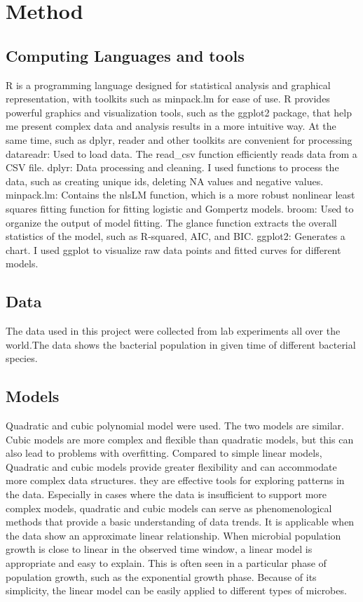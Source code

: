 \documentclass{article}
\begin{document}
\section{Method}
\subsection{Computing Languages and tools}
R is a programming language designed for statistical analysis and graphical representation, with toolkits such as minpack.lm for ease of use.
R provides powerful graphics and visualization tools, such as the ggplot2 package, that help me present complex data and analysis results in a more intuitive way. 
At the same time, such as dplyr, reader and other toolkits are convenient for processing datareadr: Used to load data. 
The read_csv function efficiently reads data from a CSV file.
dplyr: Data processing and cleaning. I used functions to process the data, such as creating unique ids, deleting NA values and negative values.
minpack.lm: Contains the nlsLM function, which is a more robust nonlinear least squares fitting function for fitting logistic and Gompertz models.
broom: Used to organize the output of model fitting. The glance function extracts the overall statistics of the model, such as R-squared, AIC, and BIC.
ggplot2: Generates a chart. I used ggplot to visualize raw data points and fitted curves for different models.

\subsection{Data}
The data used in this project were collected from lab experiments all over the world.The data shows the bacterial population in given time of different bacterial species.

\subsection{Models}

Quadratic and cubic polynomial model were used. The two models are similar. Cubic models are more complex and flexible than quadratic models, but this can also lead to problems with overfitting. Compared to simple linear models, Quadratic and cubic models provide greater flexibility and can accommodate more complex data structures\cite{penny2011}. 
they are effective tools for exploring patterns in the data. Especially in cases where the data is insufficient to support more complex models, quadratic and cubic models can serve as phenomenological methods that provide a basic understanding of data trends. It is applicable when the data show an approximate linear relationship\cite{penny2011}. When microbial population growth is close to linear in the observed time window, a linear model is appropriate and easy to explain. This is often seen in a particular phase of population growth, such as the exponential growth phase. Because of its simplicity, the linear model can be easily applied to different types of microbes.
\end{document}
